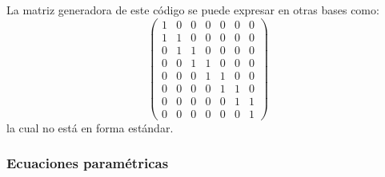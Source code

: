 La matriz generadora de este c\'odigo se puede expresar en otras bases como:
\begin{displaymath}
\left( \begin{array}{ccccccc}
1&0&0&0&0&0&0\\
1&1&0&0&0&0&0\\
0&1&1&0&0&0&0\\
0&0&1&1&0&0&0\\
0&0&0&1&1&0&0\\
0&0&0&0&1&1&0\\
0&0&0&0&0&1&1\\
0&0&0&0&0&0&1
\end{array} \right)
\end{displaymath}
la cual no est\'a en forma est\'andar.

\subsubsection{Ecuaciones param\'etricas}

